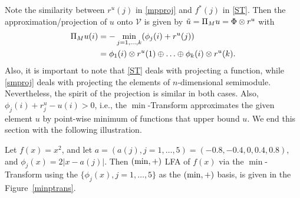Note the similarity between $r^u(j)$ in \eqref{mpproj} and $f^*(j)$ in \eqref{ST}.
Then the approximation/projection of $u$ onto $\mathcal{V}$ is given by $\tilde{u}=\Pi_M u=\Phi \otimes r^u$ with
\begin{align}\label{mplfa}
\Pi_M u(i)&=-\min_{j=1,\ldots,k}(\phi_j(i)+r^u(j))\nonumber\\
&=\phi_1(i) \otimes r^u(1)\oplus \ldots \oplus \phi_k(i) \otimes r^u(k).
\end{align}
Also, it is important to note that \eqref{ST} deals with projecting a function, while \eqref{smproj} deals with projecting the elements of $n$-dimensional semimodule. Nevertheless, the spirit of the projection is similar in both cases. Also, $\phi_j(i)+r^u_j -u(i)>0$, i.e., the $\min$-Transform approximates the given element $u$ by point-wise minimum of functions that upper bound $u$. We end this section with the following illustration.\\
\begin{example}
Let $f(x)=x^2$, and let $a=(a(j),j=1,\ldots,5)=(-0.8,-0.4,0,0.4,0.8)$, and $\phi_j(x)=2|x-a(j)|$. Then $(\min,+)$ LFA of $f(x)$ via the $\min$-Transform using the $\{\phi_j(x),j=1,\ldots,5\}$ as the $(\min,+)$ basis, is given in the Figure~\ref{minptrans}.
\end{example}
\begin{comment}
\begin{figure}\label{illust}
\begin{tikzpicture}[scale=1]
    \begin{axis}[
	xlabel=x,
        ylabel=f(x),
	]
    \addplot[smooth,black] plot file {mfiles/f.dat};
    \addplot[smooth,black] plot file {mfiles/fproj.dat};
    \addplot[dashed,black] plot file {mfiles/f1.dat};
    \addplot[dashed,black] plot file {mfiles/f2.dat};
    \addplot[dashed,black] plot file {mfiles/f3.dat};
    \addplot[dashed,black] plot file {mfiles/f4.dat};
    \addplot[dashed,black] plot file {mfiles/f5.dat};
    \end{axis}
    \end{tikzpicture}
    \caption{$\minp$ LFA of $f(x)$}
    \label{minptrans}
\end{figure}
\end{comment}
